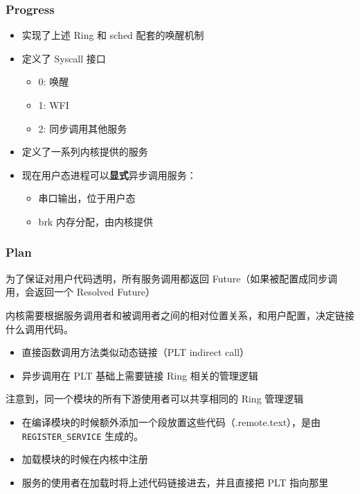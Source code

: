 \documentclass[UTF-8]{ctexbeamer}
\begin{document}
\begin{frame}
  \frametitle{Progress}
  \begin{itemize}
    \item 实现了上述 Ring 和 sched 配套的唤醒机制
    \item 定义了 Syscall 接口
    \begin{itemize}
      \item 0: 唤醒
      \item 1: WFI
      \item 2: 同步调用其他服务
    \end{itemize}
    \item 定义了一系列内核提供的服务
    \item 现在用户态进程可以\textbf{显式}异步调用服务：
    \begin{itemize}
      \item 串口输出，位于用户态
      \item brk 内存分配，由内核提供
    \end{itemize}
  \end{itemize}
\end{frame}

\begin{frame}
  \frametitle{Plan}
  
  为了保证对用户代码透明，所有服务调用都返回 Future（如果被配置成同步调用，会返回一个 Resolved Future）

  内核需要根据服务调用者和被调用者之间的相对位置关系，和用户配置，决定链接什么调用代码。

  \begin{itemize}
    \item 直接函数调用方法类似动态链接（PLT indirect call）
    \item 异步调用在 PLT 基础上需要链接 Ring 相关的管理逻辑
  \end{itemize}

  \pause
  \vspace*{1em}

  注意到，同一个模块的所有下游使用者可以共享相同的 Ring 管理逻辑

  \begin{itemize}
    \item 在编译模块的时候额外添加一个段放置这些代码（.remote.text），是由 \texttt{REGISTER\_SERVICE} 生成的。
    \item 加载模块的时候在内核中注册
    \item 服务的使用者在加载时将上述代码链接进去，并且直接把 PLT 指向那里
  \end{itemize}
\end{frame}
\end{document}
